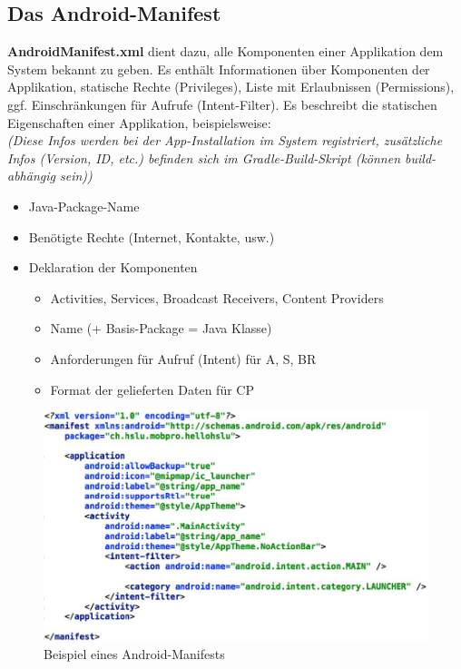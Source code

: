 \documentclass[a4paper]{article}
\begin{document}
	\newpage
	\subsection{Das Android-Manifest}
	\textbf{AndroidManifest.xml} dient dazu, alle Komponenten einer Applikation dem System bekannt zu geben. Es enthält Informationen über Komponenten der Applikation, statische Rechte (Privileges), Liste mit Erlaubnissen (Permissions), ggf. Einschränkungen für Aufrufe (Intent-Filter). Es beschreibt die statischen Eigenschaften einer Applikation, beispielsweise: \\
	\textit{(Diese Infos werden bei der App-Installation im System registriert, zusätzliche Infos (Version, ID, etc.) befinden sich im Gradle-Build-Skript (können build-abhängig sein))}
	
	\begin{itemize}
		\item Java-Package-Name
		\item Benötigte Rechte (Internet, Kontakte, usw.)
		\item Deklaration der Komponenten
		\begin{itemize}
			\item Activities, Services, Broadcast Receivers, Content Providers
			\item Name (+ Basis-Package = Java Klasse)
			\item Anforderungen für Aufruf (Intent) für A, S, BR
			\item Format der gelieferten Daten für CP
		\end{itemize}
	\end{itemize}
	\begin{figure}[htb!]
		\centering
		\includegraphics[width=12cm]{img/manifestxml.jpg}
		\caption{Beispiel eines Android-Manifests}
		\label{fig:manifestxml}
	\end{figure}
\end{document}
